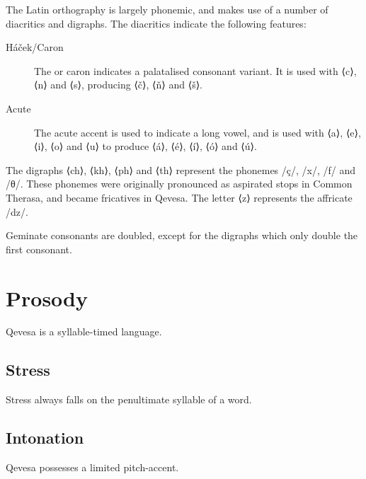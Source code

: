\documentclass[grammar]{subfiles}
\begin{document}
  The Latin orthography is largely phonemic, and makes use of a number of
  diacritics and digraphs.  The diacritics indicate the following features:

  \begin{description}
    \item[Háček/Caron] The  or caron indicates a palatalised
      consonant variant.  It is used with ⟨c⟩, ⟨n⟩ and ⟨s⟩, producing ⟨č⟩, ⟨ň⟩
      and ⟨š⟩.  
    \item[Acute] The acute accent is used to indicate a long vowel, and is used
      with ⟨a⟩, ⟨e⟩, ⟨i⟩, ⟨o⟩ and ⟨u⟩ to produce ⟨á⟩, ⟨é⟩, ⟨í⟩, ⟨ó⟩ and ⟨ú⟩.  
  \end{description}

  The digraphs ⟨ch⟩, ⟨kh⟩, ⟨ph⟩ and ⟨th⟩ represent the phonemes /ç/, /x/, /f/
  and /θ/.  These phonemes were originally pronounced as aspirated stops in
  Common Therasa, and became fricatives in Qevesa.  The letter ⟨z⟩ represents
  the affricate /dz/.

  Geminate consonants are doubled, except for the digraphs which only double
  the first consonant.  



  \section{Prosody}
  \label{sec:prosody}

  Qevesa is a syllable-timed language.
  \ToBeWritten

  \subsection{Stress}
  \label{ssec:stress}

  Stress always falls on the penultimate syllable of a word. 
  \ToBeWritten

  \subsection{Intonation}
  \label{ssec:intonation}

  Qevesa possesses a limited pitch-accent.
  \ToBeWritten
\end{document}
